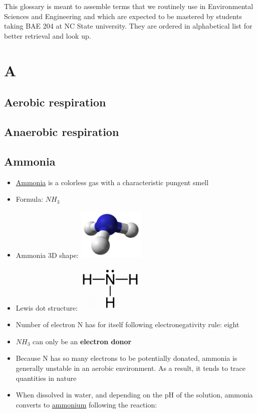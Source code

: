 \documentclass[]{book}
\providecommand{\tightlist}{%
  \setlength{\itemsep}{0pt}\setlength{\parskip}{0pt}}
\theoremstyle{definition}
\theoremstyle{definition}
\theoremstyle{definition}
\theoremstyle{remark}
\begin{document}
This glossary is meant to assemble terms that we routinely use in
Environmental Sciences and Engineering and which are expected to be
mastered by students taking BAE 204 at NC State university. They are
ordered in alphabetical list for better retrieval and look up.

\section{A}\label{a}

\subsection{Aerobic respiration}\label{aerobic-respiration}

\subsection{Anaerobic respiration}\label{anaerobic-respiration}

\subsection{Ammonia}\label{ammonia}

\begin{itemize}
\tightlist
\item
  \href{https://en.wikipedia.org/wiki/Ammonia}{Ammonia} is a colorless
  gas with a characteristic pungent smell
\item
  Formula: \(NH_3\)
\item
  Ammonia 3D shape:
  \includegraphics[width=0.25000\textwidth]{pictures/Ammonia-3D-balls-A.png}
\item
  Lewis dot structure:
  \includegraphics[width=0.25000\textwidth]{pictures/ammonia-lewis-structure.jpg}
\item
  Number of electron N has for itself following electronegativity rule:
  eight
\item
  \(NH_3\) can only be an \textbf{electron donor}
\item
  Because N has so many electrons to be potentially donated, ammonia is
  generally unstable in an aerobic environment. As a result, it tends to
  trace quantities in nature
\item
  When dissolved in water, and depending on the pH of the solution,
  ammonia converts to \protect\hyperlink{NH4}{ammonium} following the
  reaction:
\end{itemize}
\end{document}
